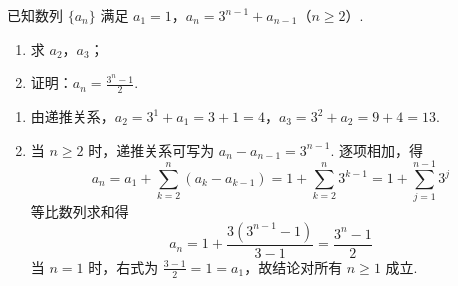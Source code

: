 \begin{problem}
已知数列 \(\{a_n\}\) 满足 \(a_1=1\)，\(a_n=3^{n-1}+a_{n-1}\)（\(n\geqslant2\)）.

\begin{enumerate}
\item 求 \(a_2\)，\(a_3\)；
\item 证明：\(a_n=\frac{3^n-1}{2}\).
\end{enumerate}

\begin{solution}
\begin{enumerate}
\item 由递推关系，\(a_2=3^1+a_1=3+1=4\)，\(a_3=3^2+a_2=9+4=13\).

\item 当 \(n\geqslant2\) 时，递推关系可写为 \(a_n-a_{n-1}=3^{n-1}\). 逐项相加，得
\[
a_n=a_1+\sum_{k=2}^{n}\left(a_k-a_{k-1}\right)
=1+\sum_{k=2}^{n}3^{k-1}
=1+\sum_{j=1}^{n-1}3^j
\]
等比数列求和得
\[
a_n=1+\frac{3(3^{n-1}-1)}{3-1}=\frac{3^n-1}{2}
\]
当 \(n=1\) 时，右式为 \(\frac{3-1}{2}=1=a_1\)，故结论对所有 \(n\geqslant1\) 成立.
\end{enumerate}
\end{solution}
\end{problem}

